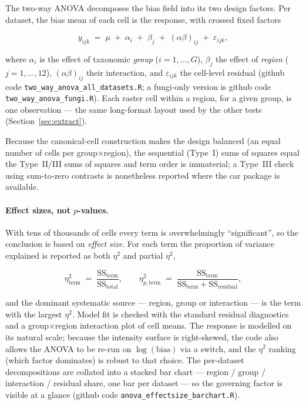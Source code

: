 The two-way ANOVA decomposes the bias field into its two design factors. Per
dataset, the bias mean of each cell is the response, with crossed fixed
factors

\begin{equation}
  y_{ijk} \;=\; \mu \;+\; \alpha_i \;+\; \beta_j \;+\;
  (\alpha\beta)_{ij} \;+\; \varepsilon_{ijk},
  \label{eq:anova}
\end{equation}

\noindent
where $\alpha_i$ is the effect of taxonomic \emph{group}
($i=1,\dots,G$), $\beta_j$ the effect of \emph{region}
($j=1,\dots,12$), $(\alpha\beta)_{ij}$ their interaction, and
$\varepsilon_{ijk}$ the cell-level residual (github code
\texttt{two\_way\_anova\_all\_datasets.R}; a fungi-only version is github
code \texttt{two\_way\_anova\_fungi.R}). Each raster cell within a region,
for a given group, is one observation --- the same long-format layout used
by the other tests (Section~\ref{sec:extract}).

Because the canonical-cell construction makes the design balanced (an equal
number of cells per group$\times$region), the sequential (Type~I) sums of
squares equal the Type~II/III sums of squares and term order is immaterial;
a Type~III check using sum-to-zero contrasts is nonetheless reported where
the \textsf{car} package is available.

\paragraph{Effect sizes, not $p$-values.}
With tens of thousands of cells every term is overwhelmingly
``significant'', so the conclusion is based on \emph{effect size}. For each
term the proportion of variance explained is reported as both $\eta^2$ and
partial $\eta^2$,

\begin{equation}
  \eta^2_{\text{term}} \;=\;
  \frac{\mathrm{SS}_{\text{term}}}{\mathrm{SS}_{\text{total}}},
  \qquad
  \eta^2_{p,\text{term}} \;=\;
  \frac{\mathrm{SS}_{\text{term}}}
       {\mathrm{SS}_{\text{term}}+\mathrm{SS}_{\text{residual}}},
  \label{eq:eta2}
\end{equation}

\noindent
and the dominant systematic source --- region, group or interaction --- is
the term with the largest $\eta^2$. Model fit is checked with the standard
residual diagnostics and a group$\times$region interaction plot of cell
means. The response is modelled on its natural scale; because the intensity
surface is right-skewed, the code also allows the ANOVA to be re-run on
$\log(\text{bias})$ via a switch, and the $\eta^2$ ranking (which factor
dominates) is robust to that choice. The per-dataset decompositions are
collated into a stacked bar chart --- region / group / interaction /
residual share, one bar per dataset --- so the governing factor is visible
at a glance (github code \texttt{anova\_effectsize\_barchart.R}).

